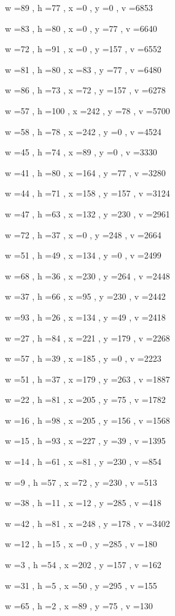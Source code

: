 \documentclass[11pt]{article}
\begin{document}
w =89 , h =77 , x =0 , y =0 , v =6853
\par
w =83 , h =80 , x =0 , y =77 , v =6640
\par
w =72 , h =91 , x =0 , y =157 , v =6552
\par
w =81 , h =80 , x =83 , y =77 , v =6480
\par
w =86 , h =73 , x =72 , y =157 , v =6278
\par
w =57 , h =100 , x =242 , y =78 , v =5700
\par
w =58 , h =78 , x =242 , y =0 , v =4524
\par
w =45 , h =74 , x =89 , y =0 , v =3330
\par
w =41 , h =80 , x =164 , y =77 , v =3280
\par
w =44 , h =71 , x =158 , y =157 , v =3124
\par
w =47 , h =63 , x =132 , y =230 , v =2961
\par
w =72 , h =37 , x =0 , y =248 , v =2664
\par
w =51 , h =49 , x =134 , y =0 , v =2499
\par
w =68 , h =36 , x =230 , y =264 , v =2448
\par
w =37 , h =66 , x =95 , y =230 , v =2442
\par
w =93 , h =26 , x =134 , y =49 , v =2418
\par
w =27 , h =84 , x =221 , y =179 , v =2268
\par
w =57 , h =39 , x =185 , y =0 , v =2223
\par
w =51 , h =37 , x =179 , y =263 , v =1887
\par
w =22 , h =81 , x =205 , y =75 , v =1782
\par
w =16 , h =98 , x =205 , y =156 , v =1568
\par
w =15 , h =93 , x =227 , y =39 , v =1395
\par
w =14 , h =61 , x =81 , y =230 , v =854
\par
w =9 , h =57 , x =72 , y =230 , v =513
\par
w =38 , h =11 , x =12 , y =285 , v =418
\par
w =42 , h =81 , x =248 , y =178 , v =3402
\par
w =12 , h =15 , x =0 , y =285 , v =180
\par
w =3 , h =54 , x =202 , y =157 , v =162
\par
w =31 , h =5 , x =50 , y =295 , v =155
\par
w =65 , h =2 , x =89 , y =75 , v =130
\par
\newpage
\end{document}
